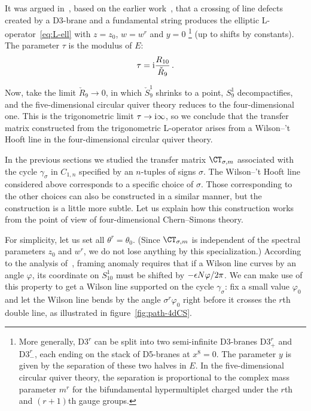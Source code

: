 It was argued in~\cite{Costello:2018txb}, based on the earlier
work~\cite{Maruyoshi:2016caf,Yagi:2017hmj}, that a crossing of line
defects created by a D3-brane and a fundamental string produces the
elliptic L-operator~\eqref{eq:L-ell} with $z = z_0$, $w = w^r$ and
$y = 0$%
%
\footnote{More generally, $\mathrm{D3}^r$ can be split into two
  semi-infinite D3-branes $\mathrm{D3}^r_+$ and $\mathrm{D3}^r_-$,
  each ending on the stack of D5-branes at $x^8 = 0$.  The parameter
  $y$ is given by the separation of these two halves in $E$.  In the
  five-dimensional circular quiver theory, the separation is
  proportional to the complex mass parameter $m^r$ for the
  bifundamental hypermultiplet charged under the $r$th and $(r+1)$th
  gauge groups.}
%
(up to shifts by constants).  The parameter $\tau$ is the modulus of
$E$:
\begin{equation}
  \tau = \mathrm{i} \frac{R_{10}}{\check{R}_9} \,.
\end{equation}

Now, take the limit $\check{R}_9 \to 0$, in which $\check{S}^1_9$
shrinks to a point, $S^1_9$ decompactifies, and the five-dimensional
circular quiver theory reduces to the four-dimensional one.  This is
the trigonometric limit $\tau \to \mathrm{i}\infty$, so we conclude that the
transfer matrix constructed from the trigonometric L-operator arises
from a Wilson--'t Hooft line in the four-dimensional circular quiver
theory.

In the previous sections we studied the transfer matrix
$\CT_{\sigma,m}$ associated with the cycle $\gamma_\sigma$ in
$C_{1,n}$ specified by an $n$-tuples of signs $\sigma$.  The
Wilson--'t Hooft line considered above corresponds to a specific
choice of $\sigma$.  Those corresponding to the other choices can also
be constructed in a similar manner, but the construction is a little
more subtle.  Let us explain how this construction works from the
point of view of four-dimensional Chern--Simons theory.

For simplicity, let us set all $\theta^r = \theta_0$.  (Since
$\CT_{\sigma,m}$ is independent of the spectral parameters $z_0$ and
$w^r$, we do not lose anything by this specialization.)  According to
the analysis of~\cite{Costello:2017dso}, framing anomaly requires that
if a Wilson line curves by an angle $\varphi$, its coordinate on
$S^1_{10}$ must be shifted by $-\epsilon N\varphi/2\pi$.  We can make use
of this property to get a Wilson line supported on the cycle
$\gamma_\sigma$: fix a small value $\varphi_0$ and let the Wilson line
bends by the angle $\sigma^r\varphi_0$ right before it crosses the
$r$th double line, as illustrated in figure~\ref{fig:path-4dCS}.

